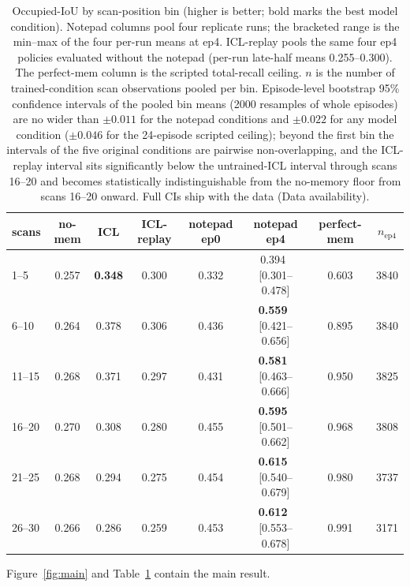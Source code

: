 \documentclass[11pt]{article}
\begin{document}
\begin{table}[t]
\centering
\caption{Occupied-IoU by scan-position bin (higher is better; bold marks the best
model condition). Notepad columns pool four replicate runs; the bracketed range is
the min--max of the four per-run means at ep4. ICL-replay pools the same four ep4
policies evaluated without the notepad (per-run late-half means 0.255--0.300). The
perfect-mem column is the scripted total-recall ceiling. $n$ is the number of
trained-condition scan observations pooled per bin. Episode-level bootstrap 95\%
confidence intervals of the pooled bin means (2000 resamples of whole episodes)
are no wider than $\pm 0.011$ for the notepad conditions and $\pm 0.022$ for any
model condition ($\pm 0.046$ for the 24-episode scripted ceiling); beyond the
first bin the intervals of the five original conditions are pairwise
non-overlapping, and the ICL-replay interval sits significantly below the
untrained-ICL interval through scans 16--20 and becomes statistically
indistinguishable from the no-memory floor from scans 16--20 onward. Full CIs
ship with the data (Data availability).}
\label{tab:main}
\footnotesize
\setlength{\tabcolsep}{4.0pt}
\begin{tabular}{@{}lccccccc@{}}
\toprule
scans & no-mem & ICL & ICL-replay & notepad ep0 & notepad ep4 & perfect-mem & $n_{\mathrm{ep4}}$ \\
\midrule
1--5   & 0.257 & \textbf{0.348} & 0.300 & 0.332 & 0.394 \,[0.301--0.478] & 0.603 & 3840 \\
6--10  & 0.264 & 0.378 & 0.306 & 0.436 & \textbf{0.559} \,[0.421--0.656] & 0.895 & 3840 \\
11--15 & 0.268 & 0.371 & 0.297 & 0.431 & \textbf{0.581} \,[0.463--0.666] & 0.950 & 3825 \\
16--20 & 0.270 & 0.308 & 0.280 & 0.455 & \textbf{0.595} \,[0.501--0.662] & 0.968 & 3808 \\
21--25 & 0.268 & 0.294 & 0.275 & 0.454 & \textbf{0.615} \,[0.540--0.679] & 0.980 & 3737 \\
26--30 & 0.266 & 0.286 & 0.259 & 0.453 & \textbf{0.612} \,[0.553--0.678] & 0.991 & 3171 \\
\bottomrule
\end{tabular}
\end{table}

Figure~\ref{fig:main} and Table~\ref{tab:main} contain the main result.
\end{document}
